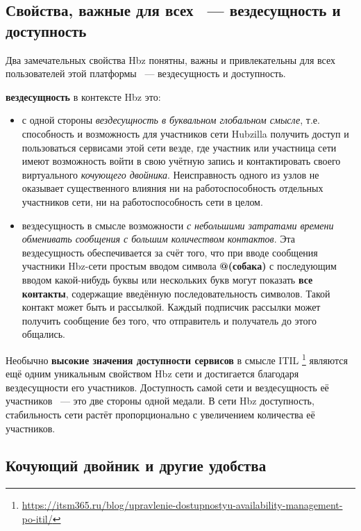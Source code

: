 \documentclass[10pt, a5paper]{article}
\begin{document}
\subsection*{Свойства, важные для всех ~--- вездесущность и доступность}

Два замечательных свойства Hbz понятны, важны и привлекательны для всех пользователей этой платформы ~--- вездесущность и доступность.

\textbf{вездесущность} в контексте Hbz это:

\begin{itemize}
  \item с одной стороны \emph{вездесущность в буквальном глобальном \linebreak смысле}, т.е. способность и возможность для участников сети \linebreak Hubzilla получить доступ и пользоваться сервисами этой сети везде, где участник или участница сети имеют возможность войти в свою учётную запись и контактировать своего виртуального \emph{кочующего двойника}. Неисправность одного из узлов не оказывает существенного влияния ни на работоспособность отдельных участников сети, ни на работоспособность сети в целом.
  \item вездесущность в смысле возможности \emph{с небольшими затратами времени обменивать сообщения с большим \linebreak количеством контактов}. Эта вездесущность обеспечивается за счёт того, что при вводе сообщения участники Hbz-сети простым вводом символа \textbf{@(собака)} с последующим вводом какой-нибудь буквы или нескольких букв могут показать \textbf{все контакты}, содержащие введённую последовательность символов. Такой контакт может быть и рассылкой. Каждый подписчик рассылки может получить сообщение без того, что отправитель и получатель до этого общались.
\end{itemize}

Необычно \textbf{высокие значения доступности сервисов} в смысле ITIL \footnote{\url{https://itsm365.ru/blog/upravlenie-dostupnostyu-availability-}\linebreak \url{management-po-itil/}} являются ещё одним уникальным свойством Hbz сети и достигается благодаря вездесущности его участников. Доступность самой сети и вездесущность её участников ~--- это две стороны одной медали. В сети Hbz доступность, стабильность сети растёт пропорционально с увеличением количества её участников.

\subsection*{Кочующий двойник и другие удобства}
\end{document}
